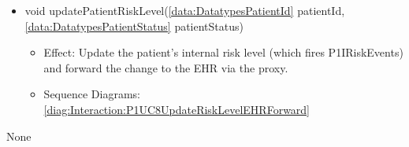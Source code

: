 \begin{description}
\begin{itemize}[noitemsep,nolistsep,leftmargin=-.25cm]
        \begin{itemize}[noitemsep,nolistsep]
           \item Effect: Remove the physician from the recipient registry. Notifications already queued for them are still delivered. 
           \item Sequence Diagrams: None
        \end{itemize}
      \item \textsf{void updatePatientRiskLevel(\ref{data:DatatypesPatientId} patientId, \ref{data:DatatypesPatientStatus} patientStatus)}
        \begin{itemize}[noitemsep,nolistsep]
           \item Effect: Update the patient's internal risk level (which fires P1IRiskEvents) and forward the change to the EHR via the  proxy. 
           \item Sequence Diagrams: \cref{diag:Interaction:P1UC8UpdateRiskLevelEHRForward}
        \end{itemize}
    \end{itemize}
      \item[Diagrams:] None
    \end{description}


